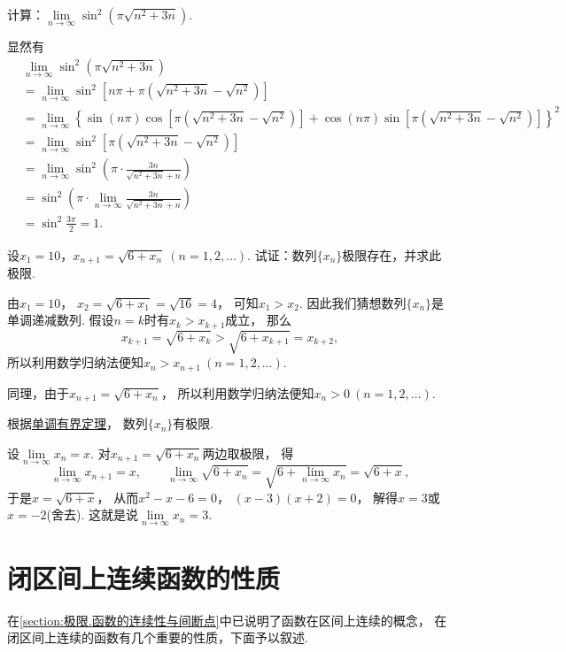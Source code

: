 \begin{example}
\def\l{\lim\limits_{n\to\infty}}
计算：\(\l \sin^2(\pi\sqrt{n^2+3n})\).
\begin{solution}
\def\a{\pi(\sqrt{n^2+3n}-\sqrt{n^2})}
显然有\begin{align*}
&\l \sin^2(\pi\sqrt{n^2+3n}) \\
&= \l \sin^2[n\pi+\a] \\
&= \l \left\{ \sin(n\pi) \cos\left[\a\right] + \cos(n\pi) \sin\left[\a\right] \right\}^2 \\
&= \l \sin^2\left[\a\right] \\
&= \l \sin^2\left( \pi \cdot \frac{3n}{\sqrt{n^2+3n}+n} \right) \\
&= \sin^2 \left( \pi \cdot \l \frac{3n}{\sqrt{n^2+3n}+n} \right) \\
&= \sin^2 \frac{3\pi}{2}
= 1.
\end{align*}
\end{solution}
\end{example}

\begin{example}
设\(x_1=10\)，\(x_{n+1}=\sqrt{6+x_n}\ (n=1,2,\dotsc)\).
试证：数列\(\{x_n\}\)极限存在，并求此极限.
\begin{solution}
由\(x_1=10\)，
\(x_2=\sqrt{6+x_1}=\sqrt{16}=4\)，
可知\(x_1>x_2\).
因此我们猜想数列\(\{x_n\}\)是单调递减数列.
假设\(n=k\)时有\(x_k>x_{k+1}\)成立，
那么\[
	x_{k+1}=\sqrt{6+x_k}>\sqrt{6+x_{k+1}}=x_{k+2},
\]
所以利用数学归纳法便知\(x_n>x_{n+1}\ (n=1,2,\dotsc)\).

同理，由于\(x_{n+1}=\sqrt{6+x_n}\)，
所以利用数学归纳法便知\(x_n>0\ (n=1,2,\dotsc)\).

根据\hyperref[theorem:极限.数列的单调有界定理]{单调有界定理}，
数列\(\{x_n\}\)有极限.

设\(\lim\limits_{n\to\infty}x_n=x\).
对\(x_{n+1}=\sqrt{6+x_n}\)两边取极限，
得\[
	\lim\limits_{n\to\infty}x_{n+1}=x, \qquad
	\lim\limits_{n\to\infty}\sqrt{6+x_n}
	=\sqrt{6+\lim\limits_{n\to\infty}x_n}
	=\sqrt{6+x},
\]
于是\(x=\sqrt{6+x}\)，
从而\(x^2-x-6=0\)，
\((x-3)(x+2)=0\)，
解得\(x=3\)或\(x=-2\)(舍去).
这就是说\(\lim\limits_{n\to\infty}x_n=3\).
\end{solution}
\end{example}

\section{闭区间上连续函数的性质}
在\cref{section:极限.函数的连续性与间断点}中已说明了函数在区间上连续的概念，
在闭区间上连续的函数有几个重要的性质，下面予以叙述.

